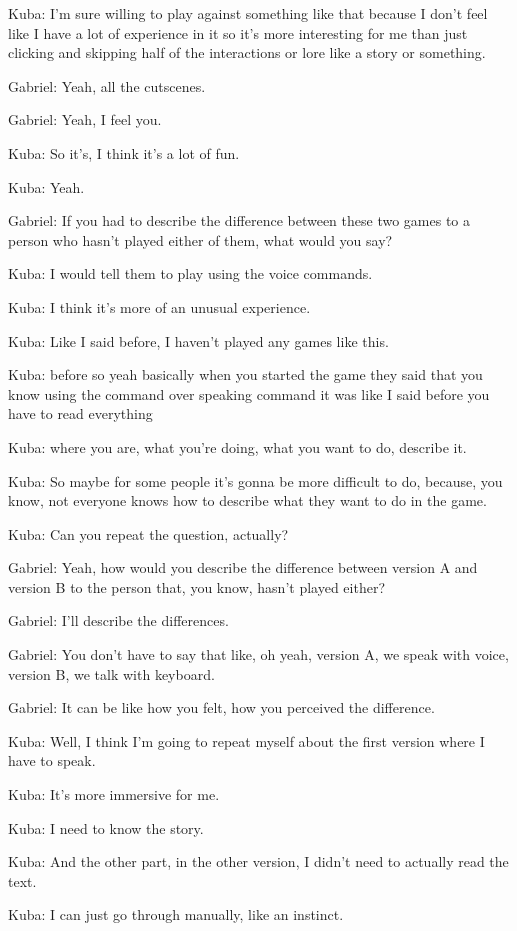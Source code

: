 Kuba: I'm sure willing to play against something like that because I don't feel like I have a lot of experience in it so it's more interesting for me than just clicking and skipping half of the interactions or lore like a story or something.

Gabriel: Yeah, all the cutscenes.

Gabriel: Yeah, I feel you.

Kuba: So it's, I think it's a lot of fun.

Kuba: Yeah.

Gabriel: If you had to describe the difference between these two games to a person who hasn't played either of them, what would you say?

Kuba: I would tell them to play using the voice commands.

Kuba: I think it's more of an unusual experience.

Kuba: Like I said before, I haven't played any games like this.

Kuba: before so yeah basically when you started the game they said that you know using the command over speaking command it was like I said before you have to read everything

Kuba: where you are, what you're doing, what you want to do, describe it.

Kuba: So maybe for some people it's gonna be more difficult to do, because, you know, not everyone knows how to describe what they want to do in the game.

Kuba: Can you repeat the question, actually?

Gabriel: Yeah, how would you describe the difference between version A and version B to the person that, you know, hasn't played either?

Gabriel: I'll describe the differences.

Gabriel: You don't have to say that like, oh yeah, version A, we speak with voice, version B, we talk with keyboard.

Gabriel: It can be like how you felt, how you perceived the difference.

Kuba: Well, I think I'm going to repeat myself about the first version where I have to speak.

Kuba: It's more immersive for me.

Kuba: I need to know the story.

Kuba: And the other part, in the other version, I didn't need to actually read the text.

Kuba: I can just go through manually, like an instinct.

